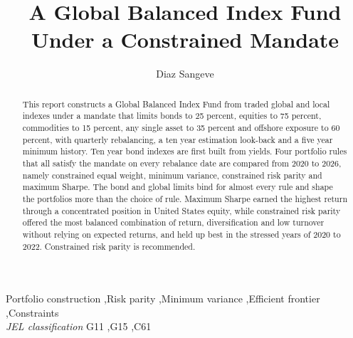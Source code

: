 \documentclass[11pt,preprint]{elsarticle}
\numberwithin{equation}{section}
\numberwithin{figure}{section}
\numberwithin{table}{section}
\begin{document}
\begin{frontmatter}  %

\title{A Global Balanced Index Fund Under a Constrained Mandate}





\author[Add1]{Diaz Sangeve}





\address[Add1]{Stellenbosch University, Stellenbosch, South Africa}


\begin{abstract}
\small{
This report constructs a Global Balanced Index Fund from traded global
and local indexes under a mandate that limits bonds to 25 percent,
equities to 75 percent, commodities to 15 percent, any single asset to
35 percent and offshore exposure to 60 percent, with quarterly
rebalancing, a ten year estimation look-back and a five year minimum
history. Ten year bond indexes are first built from yields. Four
portfolio rules that all satisfy the mandate on every rebalance date are
compared from 2020 to 2026, namely constrained equal weight, minimum
variance, constrained risk parity and maximum Sharpe. The bond and
global limits bind for almost every rule and shape the portfolios more
than the choice of rule. Maximum Sharpe earned the highest return
through a concentrated position in United States equity, while
constrained risk parity offered the most balanced combination of return,
diversification and low turnover without relying on expected returns,
and held up best in the stressed years of 2020 to 2022. Constrained risk
parity is recommended.
}
\end{abstract}

\vspace{1cm}


\begin{keyword}
\footnotesize{
Portfolio construction \sep Risk parity \sep Minimum variance
\sep Efficient frontier \sep Constraints \\
\vspace{0.3cm}
}
\footnotesize{
\textit{JEL classification} G11 \sep G15 \sep C61
}
\end{keyword}



\vspace{0.5cm}

\end{frontmatter}
\end{document}
